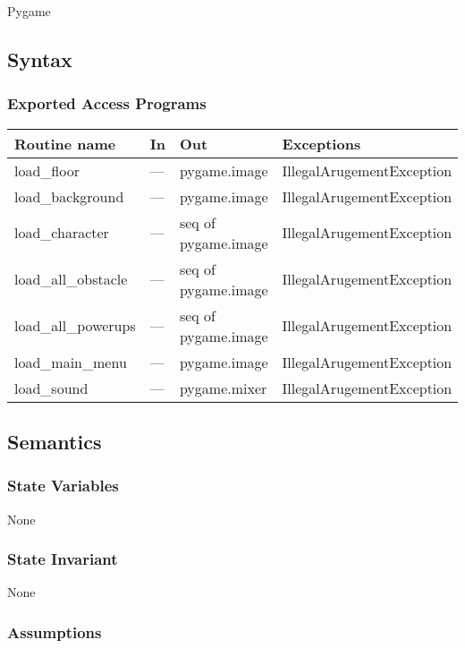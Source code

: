 \documentclass[12pt]{article}
\begin{document}
Pygame


\subsection* {Syntax}

\subsubsection* {Exported Access Programs}

\begin{tabular}{| l | l | l | l |}
\hline
\textbf{Routine name} & \textbf{In} & \textbf{Out} & \textbf{Exceptions}\\
\hline
    load\_floor & --- & pygame.image & IllegalArugementException\\
\hline
    load\_background & --- & pygame.image & IllegalArugementException\\
\hline
    load\_character & --- & seq of pygame.image & IllegalArugementException\\
\hline
load\_all\_obstacle & --- & seq of pygame.image & IllegalArugementException\\
\hline
load\_all\_powerups & --- &  seq of pygame.image & IllegalArugementException\\
\hline
load\_main\_menu & --- &   pygame.image & IllegalArugementException\\
\hline
load\_sound & --- &   pygame.mixer & IllegalArugementException\\
\hline
\end{tabular}

\subsection* {Semantics}

\subsubsection* {State Variables}

None

\subsubsection* {State Invariant}

None

\subsubsection* {Assumptions}
\end{document}
